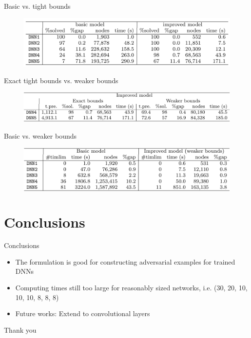\documentclass{beamer}
\begin{document}
\begin{frame}{Basic vs. tight bounds}
  \begin{figure}
    \centering
    \includegraphics[width=\columnwidth]{tab-1.png}
  \end{figure}
\end{frame}

\begin{frame}{Exact tight bounds vs. weaker bounds}
  \begin{figure}
    \centering
    \includegraphics[width=\columnwidth]{tab-2.png}
  \end{figure}
\end{frame}

\begin{frame}{Basic vs. weaker bounds}
  \begin{figure}
    \centering
    \includegraphics[width=\columnwidth]{tab-3.png}
  \end{figure}
\end{frame}

\section{Conclusions}
\begin{frame}{Conclusions}
  \begin{itemize}
  \item The formulation is good for constructing adversarial examples for trained DNNs
  \item Computing times still too large for reasonably sized networks, i.e. (30, 20, 10, 10, 10, 8, 8, 8)
  \item Future works: Extend to convolutional layers
  \end{itemize}
\end{frame}

\begin{frame}
  \Huge{\centerline{Thank you}}
\end{frame}
\end{document}
